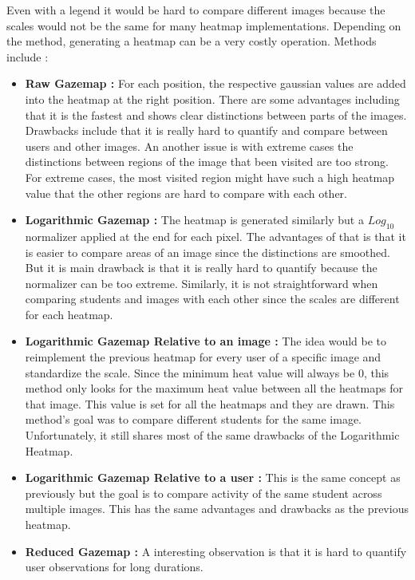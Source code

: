 \documentclass[a4paper,11pt]{report}
\numberwithin{figure}{section} %
\begin{document}
\begin{itemize}
        Even with a legend it would be hard to compare different images because the scales would not be the same for many heatmap implementations.
        Depending on the method, generating a heatmap can be a very costly operation.
        Methods include :
        \begin{itemize}
            \item \textbf{Raw Gazemap :} For each position, the respective gaussian values are added into the heatmap at the right position.
            There are some advantages including that it is the fastest and shows clear distinctions between parts of the images.
            Drawbacks include that it is really hard to quantify and compare between users and other images.
            An another issue is with extreme cases the distinctions between regions of the image that been visited are too strong.
            For extreme cases, the most visited region might have such a high heatmap value that the other regions are hard to compare with each other.
            \item \textbf{Logarithmic Gazemap :} The heatmap is generated similarly but a $Log_{10}$ normalizer applied at the end for each pixel.
            The advantages of that is that it is easier to compare areas of an image since the distinctions are smoothed.
            But it is main drawback is that it is really hard to quantify because the normalizer can be too extreme.
            Similarly, it is not straightforward when comparing students and images with each other since the scales are different for each heatmap.
            \item \textbf{Logarithmic Gazemap Relative to an image :} The idea would be to reimplement the previous heatmap for every user of a specific image and standardize the scale.
            Since the minimum heat value will always be 0, this method only looks for the maximum heat value between all the heatmaps for that image.
            This value is set for all the heatmaps and they are drawn. This method's goal was to compare different students for the same image.
            Unfortunately, it still shares most of the same drawbacks of the Logarithmic Heatmap.
            \item \textbf{Logarithmic Gazemap Relative to a user :} This is the same concept as previously but the goal is to compare activity of the same student across multiple images.
            This has the same advantages and drawbacks as the previous heatmap.
            \item \textbf{Reduced Gazemap :} A interesting observation is that it is hard to quantify user observations for long durations.

\end{itemize}
\end{itemize}
\end{document}
